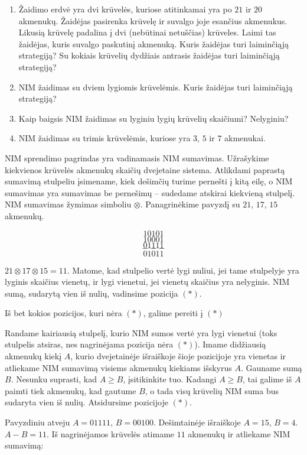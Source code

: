 \begin{enumerate}
  \item Žaidimo erdvė yra dvi krūvelės, kuriose atitinkamai yra po $21$ ir
    $20$ akmenukų. Žaidėjas pasirenka krūvelę ir suvalgo joje esančius akmenukus.
    Likusią krūvelę padalina į dvi (nebūtinai netuščias)
    krūveles. Laimi tas žaidėjas, kuris suvalgo paskutinį akmenuką. Kuris
    žaidėjas turi laiminčiąją strategiją? Su kokiais krūvelių dydžiais
    antrasis žaidėjas turi laiminčiąją strategiją? 
  \item NIM žaidimas su dviem lygiomis krūvelėmis. Kuris žaidėjas turi
    laiminčiąją strategiją?
  \item Kaip baigsis NIM žaidimas su lyginiu lygių krūvelių skaičiumi?
    Nelyginiu? 
  \item NIM žaidimas su trimis krūvelėmis, kuriose yra $3$, $5$ ir $7$
    akmenukai.
\end{enumerate} 

NIM sprendimo pagrindas yra vadinamasis NIM sumavimas. Užrašykime
kiekvienos krūvelės akmenukų skaičių dvejetaine sistema. Atlikdami paprastą
sumavimą stulpeliu įsimename, kiek dešimčių turime pernešti į kitą
eilę, o NIM sumavimas yra sumavimas be pernešimų – sudedame atskirai
kiekvieną stulpelį. NIM sumavimas žymimas simboliu $\otimes$.
Panagrinėkime pavyzdį su  $21$, $17$, $15$ akmenukų. 

$$10101$$$$10001$$$$01111$$$$---$$$$01011$$

$21 \otimes 17 \otimes 15=11$. Matome, kad stulpelio vertė lygi nuliui, jei
tame stulpelyje yra lyginis skaičius vienetų, ir lygi vienetui, jei vienetų
skaičius yra nelyginis. NIM sumą, sudarytą vien iš nulių, vadinsime pozicija
$(*)$. 

\begin{teig}
  Iš bet kokios pozicijos, kuri nėra $(*)$, galime pereiti į  $(*)$
\end{teig}

Randame kairiausią stulpelį, kurio NIM sumos vertė yra lygi vienetui (toks
stulpelis atsiras, nes nagrinėjama pozicija nėra $(*)$). Imame didžiausią
akmenukų kiekį $A$, kurio dvejetainėje išraiškoje šioje pozicijoje yra
vienetas ir atliekame NIM sumavimą visiems akmenukų kiekiams išskyrus $A$.
Gauname sumą $B$.  Nesunku suprasti, kad $A\geq B$, įsitikinkite tuo. Kadangi
$A\geq B$, tai galime iš $A$ paimti tiek akmenukų, kad gautume $B$, o tada visų
krūvelių NIM suma bus sudaryta vien iš nulių. Atsidursime pozicijoje $(*)$.

Pavyzdiniu atveju $A = 01111$, $B = 00100$. Dešimtainėje išraiškoje $A =
15$, $B = 4$. $A - B = 11$. Iš nagrinėjamos krūvelės atimame $11$ akmenukų ir
atliekame NIM sumavimą: 

